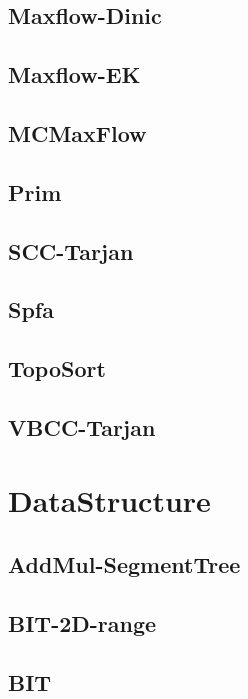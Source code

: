 \documentclass{article}
\begin{document}
\subsection{Maxflow-Dinic}

\subsection{Maxflow-EK}

\subsection{MCMaxFlow}

\subsection{Prim}

\subsection{SCC-Tarjan}

\subsection{Spfa}

\subsection{TopoSort}

\subsection{VBCC-Tarjan}

\section{DataStructure}
\subsection{AddMul-SegmentTree}

\subsection{BIT-2D-range}

\subsection{BIT}

\end{document}
